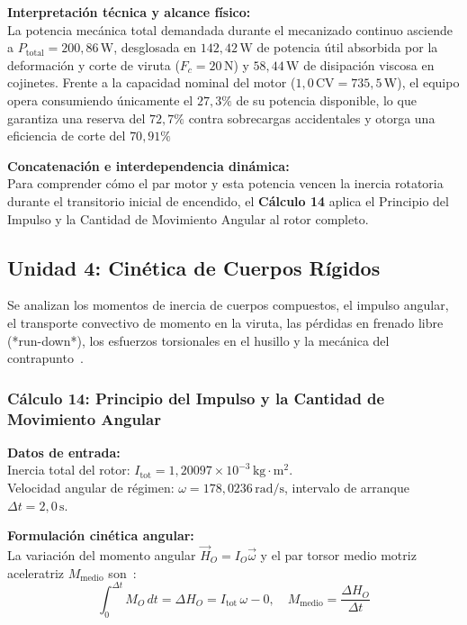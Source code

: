 \documentclass[12pt,a4paper]{article}
\begin{document}
\noindent\textbf{Interpretación técnica y alcance físico:}\\
La potencia mecánica total demandada durante el mecanizado continuo asciende a $P_{\text{total}} = 200{,}86\,\text{W}$, desglosada en $142{,}42\,\text{W}$ de potencia útil absorbida por la deformación y corte de viruta ($F_c = 20\,\text{N}$) y $58{,}44\,\text{W}$ de disipación viscosa en cojinetes. Frente a la capacidad nominal del motor ($1{,}0\,\text{CV} = 735{,}5\,\text{W}$), el equipo opera consumiendo únicamente el $27{,}3\%$ de su potencia disponible, lo que garantiza una reserva del $72{,}7\%$ contra sobrecargas accidentales y otorga una eficiencia de corte del $70{,}91\%$

\noindent\textbf{Concatenación e interdependencia dinámica:}\\
Para comprender cómo el par motor y esta potencia vencen la inercia rotatoria durante el transitorio inicial de encendido, el \textbf{Cálculo 14} aplica el Principio del Impulso y la Cantidad de Movimiento Angular al rotor completo.

\subsection{Unidad 4: Cinética de Cuerpos Rígidos}
Se analizan los momentos de inercia de cuerpos compuestos, el impulso angular, el transporte convectivo de momento en la viruta, las pérdidas en frenado libre (*run-down*), los esfuerzos torsionales en el husillo y la mecánica del contrapunto~\cite{guia_dinamica, hibbeler2016, shigley2015, urinov2024}.

\subsubsection{Cálculo 14: Principio del Impulso y la Cantidad de Movimiento Angular}

\noindent\textbf{Datos de entrada:}\\
Inercia total del rotor: $I_{\text{tot}} = 1{,}20097\times 10^{-3}\,\text{kg}\cdot\text{m}^2$.\\
Velocidad angular de régimen: $\omega = 178{,}0236\,\text{rad/s}$, intervalo de arranque $\Delta t = 2{,}0\,\text{s}$.
\vspace{6pt}

\noindent\textbf{Formulación cinética angular:}\\
La variación del momento angular $\vec{H}_O = I_O \vec{\omega}$ y el par torsor medio motriz aceleratriz $M_{\text{medio}}$ son~\cite{hibbeler2016, meriam2015}:
\begin{equation}
    \int_0^{\Delta t} M_O \, dt = \Delta H_O = I_{\text{tot}}\,\omega - 0, \quad M_{\text{medio}} = \frac{\Delta H_O}{\Delta t}
\end{equation}
\vspace{6pt}
\end{document}
